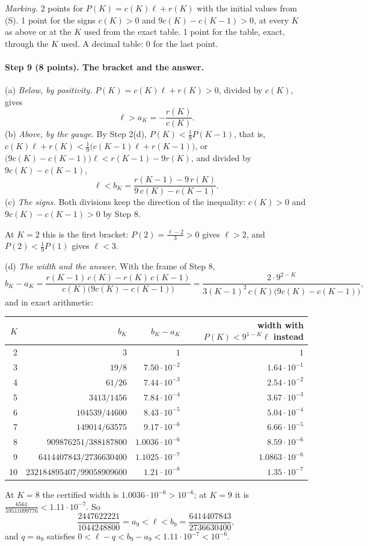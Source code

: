 \documentclass[11pt]{article}
\theoremstyle{plain}
\theoremstyle{definition}
\theoremstyle{remark}
\begin{document}
\smallskip\noindent\emph{Marking.} 2 points for $P(K)=c(K)\ell+r(K)$ with the initial values from (S). 1 point for the signs $c(K)>0$ and $9c(K)-c(K-1)>0$, at every $K$ as above or at the $K$ used from the exact table. 1 point for the table, exact, through the $K$ used. A decimal table: 0 for the last point.

\paragraph{Step 9 (8 points). The bracket and the answer.}
(a) \emph{Below, by positivity.} $P(K)=c(K)\ell+r(K)>0$, divided by $c(K)$, gives
\[
\ell>a_K=-\frac{r(K)}{c(K)} .
\]
(b) \emph{Above, by the gauge.} By Step 2(d), $P(K)<\frac19P(K-1)$, that is, $c(K)\ell+r(K)<\frac19\big(c(K-1)\ell+r(K-1)\big)$, or $\big(9c(K)-c(K-1)\big)\ell<r(K-1)-9r(K)$, and divided by $9c(K)-c(K-1)$,
\[
\ell<b_K=\frac{r(K-1)-9\,r(K)}{9\,c(K)-c(K-1)} .
\]
(c) \emph{The signs.} Both divisions keep the direction of the inequality: $c(K)>0$ and $9c(K)-c(K-1)>0$ by Step 8.

At $K=2$ this is the first bracket: $P(2)=\frac{\ell-2}3>0$ gives $\ell>2$, and $P(2)<\frac19P(1)$ gives $\ell<3$.

(d) \emph{The width and the answer.} With the frame of Step 8,
\[
b_K-a_K=\frac{r(K-1)\,c(K)-r(K)\,c(K-1)}{c(K)\big(9c(K)-c(K-1)\big)}=\frac{2\cdot9^{2-K}}{3(K-1)^2\,c(K)\big(9c(K)-c(K-1)\big)},
\]
and in exact arithmetic:
\begin{center}
\small
\renewcommand{\arraystretch}{1.12}
\begin{tabular}{@{}r r r r@{}}
\toprule
$K$ & $b_K$ & $b_K-a_K$ & width with $P(K)<9^{1-K}\ell$ instead\\ \midrule
2 & $3$ & $1$ & $1$\\
3 & $19/8$ & $7.50\cdot10^{-2}$ & $1.64\cdot10^{-1}$\\
4 & $61/26$ & $7.44\cdot10^{-3}$ & $2.54\cdot10^{-2}$\\
5 & $3413/1456$ & $7.84\cdot10^{-4}$ & $3.67\cdot10^{-3}$\\
6 & $104539/44600$ & $8.43\cdot10^{-5}$ & $5.04\cdot10^{-4}$\\
7 & $149014/63575$ & $9.17\cdot10^{-6}$ & $6.66\cdot10^{-5}$\\
8 & $909876251/388187800$ & $1.0036\cdot10^{-6}$ & $8.59\cdot10^{-6}$\\
9 & $6414407843/2736630400$ & $1.1025\cdot10^{-7}$ & $1.0863\cdot10^{-6}$\\
10 & $232184895407/99058909600$ & $1.21\cdot10^{-8}$ & $1.35\cdot10^{-7}$\\
\bottomrule
\end{tabular}
\end{center}
At $K=8$ the certified width is $1.0036\cdot10^{-6}>10^{-6}$; at $K=9$ it is $\frac{6561}{59511099776}<1.11\cdot10^{-7}$. So
\[
\frac{2447622221}{1044248800}=a_9<\ell<b_9=\frac{6414407843}{2736630400},
\]
and $q=a_9$ satisfies $0<\ell-q<b_9-a_9<1.11\cdot10^{-7}<10^{-6}$.
\end{document}
